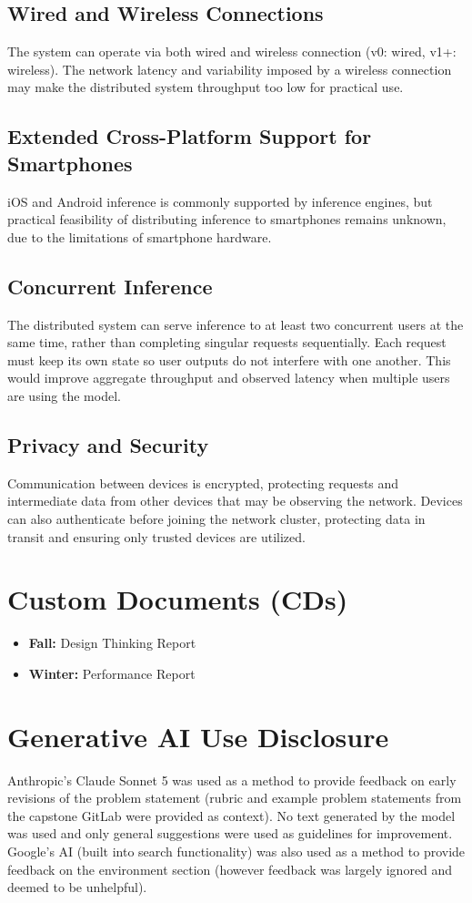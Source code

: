 \documentclass{article}
\begin{document}
\subsection{Wired and Wireless Connections}
The system can operate via both wired and wireless connection (v0: wired, v1+: wireless). The network latency and variability imposed by a wireless connection may make the distributed system throughput too low for practical use.

\subsection{Extended Cross-Platform Support for Smartphones}
iOS and Android inference is commonly supported by inference engines, but practical feasibility of distributing inference to smartphones remains unknown, due to the limitations of smartphone hardware.

\subsection{Concurrent Inference}
The distributed system can serve inference to at least two concurrent users at the same time, rather than completing singular requests sequentially. Each request must keep its own state so user outputs do not interfere with one another. This would improve aggregate throughput and observed latency when multiple users are using the model.

\subsection{Privacy and Security}
Communication between devices is encrypted, protecting requests and intermediate data from other devices that may be observing the network. Devices can also authenticate before joining the network cluster, protecting data in transit and ensuring only trusted devices are utilized.

\section{Custom Documents (CDs)}

\begin{itemize}
    \item \textbf{Fall:} Design Thinking Report
    \item \textbf{Winter:} Performance Report
\end{itemize}

\section{Generative AI Use Disclosure}
Anthropic's Claude Sonnet 5 was used as a method to provide feedback on early revisions of the problem statement (rubric and example problem statements from the capstone GitLab were provided as context). No text generated by the model was used and only general suggestions were used as guidelines for improvement.
Google's AI (built into search functionality) was also used as a method to provide feedback on the environment section (however feedback was largely ignored and deemed to be unhelpful).
\end{document}
